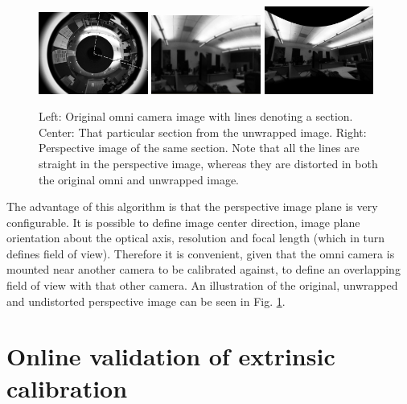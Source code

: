 \begin{figure}[h]
  \centering
    \includegraphics[width=0.32\textwidth]{chapters/images/omni_raw_office}
    \includegraphics[width=0.32\textwidth]{chapters/images/unwrapped_office}
    \includegraphics[width=0.32\textwidth]{chapters/images/perspective_office}
  \caption{Left: Original omni camera image with lines denoting a section.  Center: That particular section from the unwrapped image.  Right: Perspective image of the same section.  Note that all the lines are straight in the perspective image, whereas they are distorted in both the original omni and unwrapped image.}
  \label{fig:omni_images}
\end{figure}

The advantage of this algorithm is that the perspective image plane is very configurable.  It is possible to define image center direction, image plane orientation about the optical axis, resolution and focal length (which in turn defines field of view).  Therefore it is convenient, given that the omni camera is mounted near another camera to be calibrated against, to define an overlapping field of view with that other camera. An illustration of the original, unwrapped and undistorted perspective image can be seen in Fig. \ref{fig:omni_images}.

\section{Online validation of extrinsic calibration}
\label{sec:verification_tool}

